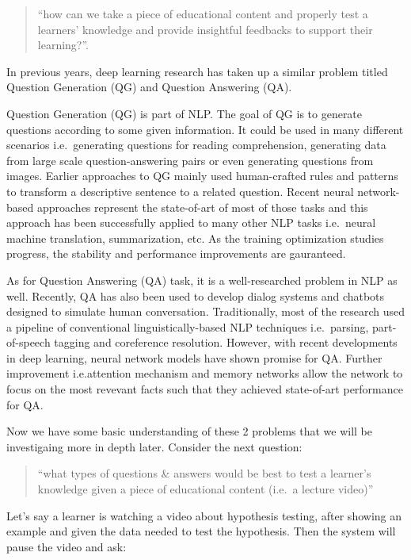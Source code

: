 \documentclass{acm_proc_article-sp}
\begin{document}
\begin{quote}
``how can we take a piece of educational content and properly test a
learners' knowledge and provide insightful feedbacks to support their
learning?''.
\end{quote}

In previous years, deep learning research has taken up a similar problem
titled Question Generation (QG) and Question Answering (QA).

Question Generation (QG) is part of NLP. The goal of QG is to generate
questions according to some given information. It could be used in many
different scenarios i.e.~generating questions for reading comprehension,
generating data from large scale question-answering pairs or even
generating questions from images. Earlier approaches to QG mainly used
human-crafted rules and patterns to transform a descriptive sentence to
a related question. Recent neural network-based approaches represent the
state-of-art of most of those tasks and this approach has been
successfully applied to many other NLP tasks i.e.~neural machine
translation, summarization, etc. As the training optimization studies
progress, the stability and performance improvements are gauranteed.

As for Question Answering (QA) task, it is a well-researched problem in
NLP as well. Recently, QA has also been used to develop dialog systems
and chatbots designed to simulate human conversation. Traditionally,
most of the research used a pipeline of conventional
linguistically-based NLP techniques i.e.~parsing, part-of-speech tagging
and coreference resolution. However, with recent developments in deep
learning, neural network models have shown promise for QA. Further
improvement i.e.attention mechanism and memory networks allow the
network to focus on the most revevant facts such that they achieved
state-of-art performance for QA.

Now we have some basic understanding of these 2 problems that we will be
investigaing more in depth later. Consider the next question:

\begin{quote}
``what types of questions \& answers would be best to test a learner's
knowledge given a piece of educational content (i.e.~a lecture video)''
\end{quote}

Let's say a learner is watching a video about hypothesis testing, after
showing an example and given the data needed to test the hypothesis.
Then the system will pause the video and ask:
\end{document}
